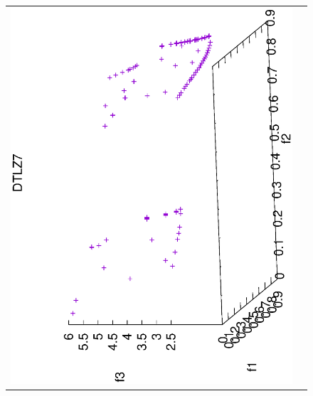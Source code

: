 \begin{figure}[H]
\begin{tabular}{cc}
 \includegraphics[scale=0.3, angle=-90,origin=c]{Figures_Chapter7/Results_Chapter4/Summary_Representative/VSD-MOEA-D/DTLZ7.eps} 
\end{tabular}
\end{figure}
